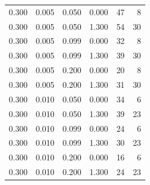 \begin{table}
\begin{tabular}{rrrrrr}
0.300 & 0.005 & 0.050 & 0.000 & 47 & 8 \\
0.300 & 0.005 & 0.050 & 1.300 & 54 & 30 \\
0.300 & 0.005 & 0.099 & 0.000 & 32 & 8 \\
0.300 & 0.005 & 0.099 & 1.300 & 39 & 30 \\
0.300 & 0.005 & 0.200 & 0.000 & 20 & 8 \\
0.300 & 0.005 & 0.200 & 1.300 & 31 & 30 \\
0.300 & 0.010 & 0.050 & 0.000 & 34 & 6 \\
0.300 & 0.010 & 0.050 & 1.300 & 39 & 23 \\
0.300 & 0.010 & 0.099 & 0.000 & 24 & 6 \\
0.300 & 0.010 & 0.099 & 1.300 & 30 & 23 \\
0.300 & 0.010 & 0.200 & 0.000 & 16 & 6 \\
0.300 & 0.010 & 0.200 & 1.300 & 24 & 23 \\
\bottomrule
\end{tabular}
\end{table}
